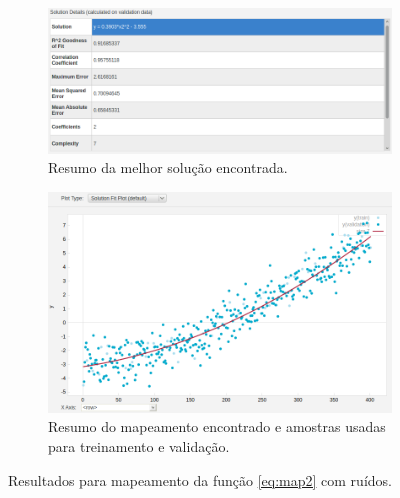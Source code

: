 \begin{figure}[h!]
		\begin{subfigure}{.5\textwidth}
		  \centering
		  \includegraphics[width=1\linewidth]{image/best_solucao_map2_r_info}
		  \caption{\centering Resumo da melhor solução encontrada.}
		  \label{fig:map2_best_c_ruido} 
		\end{subfigure} %
		\begin{subfigure}{.45\textwidth}
		  \centering
		  \includegraphics[width=1\linewidth]{image/best_solucao_map2_r}
		  \caption{\centering Resumo do mapeamento encontrado e amostras usadas para
		  treinamento e validação.}
		  \label{fig:map2_c_ruido} 
		\end{subfigure}
	
	\caption{Resultados para mapeamento da função \ref{eq:map2} com ruídos.}
	\end{figure}
	
	\FloatBarrier 
